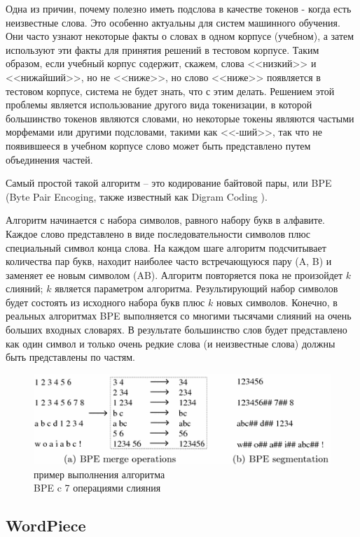 \documentclass[a4paper,12pt,preview]{report} %
\begin{document}
	Одна из причин, почему полезно иметь подслова в качестве токенов - когда есть неизвестные слова.
	Это особенно актуальны для систем машинного обучения. Они часто узнают некоторые факты о словах
	в одном корпусе (учебном), а затем используют эти факты для принятия решений в тестовом корпусе. Таким образом, если учебный корпус содержит, скажем,
	слова <<низкий>> и <<нижайший>>, но не <<ниже>>, но слово <<ниже>> появляется в тестовом
	корпусе, система не будет знать, что с этим делать.
	Решением этой проблемы является использование другого вида токенизации, в которой большинство токенов
	являются словами, но некоторые токены являются частыми морфемами или другими подсловами, такими как <<-ший>>, так что не появившееся в учебном корпусе слово может быть представлено путем объединения частей.
	
	Самый простой такой алгоритм -- это кодирование байтовой пары, или BPE (Byte Pair Encoging, также известный как Digram Coding \cite{5}).
	
	Алгоритм начинается с набора символов, равного набору букв в алфавите. Каждое	слово представлено в виде последовательности символов плюс специальный символ конца слова. На каждом шаге алгоритм подсчитывает количества пар букв, находит
	наиболее часто встречающуюся пару (A, B) и заменяет ее новым символом (AB). Алгоритм повторяется пока не произойдет $k$ слияний; $k$ является параметром алгоритма. Результирующий набор символов
	будет состоять из исходного набора букв плюс $k$ новых символов.
	Конечно, в реальных алгоритмах BPE выполняется со многими тысячами слияний на очень больших входных словарях. В результате большинство слов будет представлено как один символ и только очень редкие слова (и неизвестные слова) должны быть представлены по частям.
	
	\begin{figure}[H]
		\centering\includegraphics[scale=0.8]{bpe.png}
		\caption{пример выполнения алгоритма \\ BPE c 7 операциями слияния}
		\label{fig:bpe}
	\end{figure}
	
	
	\subsection{WordPiece}
	
\end{document}
